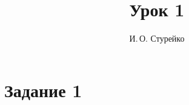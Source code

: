\documentclass{article}
\begin{document}
	\title{Урок 1}
	\author{И.\,О. Стурейко}
	\maketitle
%	
\section{Задание 1}
\end{document}
